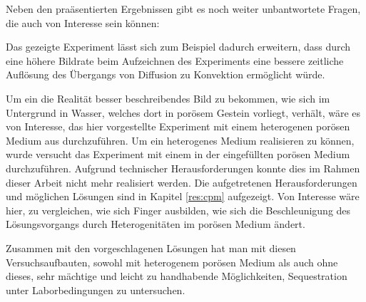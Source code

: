 
Neben den praäsentierten Ergebnissen gibt es noch weiter unbantwortete Fragen, die auch von Interesse sein können:


Das gezeigte Experiment lässt sich zum Beispiel dadurch erweitern, dass durch eine höhere Bildrate beim Aufzeichnen des Experiments eine bessere zeitliche Auflösung des Übergangs von Diffusion zu Konvektion ermöglicht würde. 


Um ein die Realität besser beschreibendes Bild zu bekommen, wie sich \COT im Untergrund in Wasser, welches dort in porösem Gestein vorliegt, verhält, wäre es von Interesse, das hier vorgestellte \COTm Experiment mit einem heterogenen porösen Medium aus \BOG durchzuführen. 
Um ein heterogenes Medium realisieren zu können, wurde versucht das Experiment mit einem in der \HSC eingefüllten porösen Medium durchzuführen. Aufgrund technischer Herausforderungen konnte dies im Rahmen dieser Arbeit nicht mehr realisiert werden. Die aufgetretenen Herausforderungen und möglichen Lösungen sind in Kapitel \ref{res:cpm} aufgezeigt.
Von Interesse wäre hier, zu vergleichen, wie sich Finger ausbilden, \dah wie sich die Beschleunigung des Lösungsvorgangs durch Heterogenitäten im porösen Medium ändert.

Zusammen mit den vorgeschlagenen Lösungen hat man mit diesen Versuchsaufbauten, sowohl mit heterogenem porösen Medium als auch ohne dieses, sehr mächtige und leicht zu handhabende Möglichkeiten, \COTm Sequestration unter Laborbedingungen zu untersuchen.